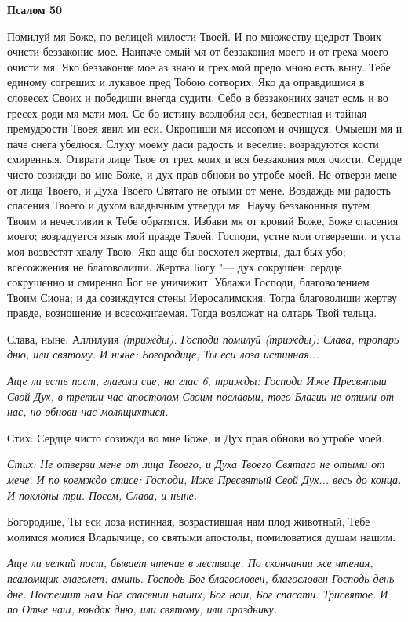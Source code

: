 \bfseries Псалом 50\normalfont{}


Помилуй мя Боже, по велицей милости Твоей. И по множеству щедрот Твоих очисти беззаконие мое. Наипаче омый мя от беззакония моего и от греха моего очисти мя. Яко беззаконие мое аз знаю и грех мой предо мною есть выну. Тебе единому согреших и лукавое пред Тобою сотворих. Яко да оправдишися в словесех Своих и победиши внегда судити. Себо в беззакониих зачат есмь и во гресех роди мя мати моя. Се бо истину возлюбил еси, безвестная и тайная премудрости Твоея явил ми еси. Окропиши мя иссопом и очищуся. Омыеши мя и паче снега убелюся. Слуху моему даси радость и веселие: возрадуются кости смиренныя. Отврати лице Твое от грех моих и вся беззакония моя очисти. Сердце чисто созижди во мне Боже, и дух прав обнови во утробе моей. Не отверзи мене от лица Твоего, и Духа Твоего Святаго не отыми от мене. Воздаждь ми радость спасения Твоего и духом владычным утверди мя. Научу беззаконныя путем Твоим и нечестивии к Тебе обратятся. Избави мя от кровий Боже, Боже спасения моего; возрадуется язык мой правде Твоей. Господи, устне мои отверзеши, и уста моя возвестят хвалу Твою. Яко аще бы восхотел жертвы, дал бых убо; всесожжения не благоволиши. Жертва Богу "--- дух сокрушен: сердце сокрушенно и смиренно Бог не уничижит. Ублажи Господи, благоволением Твоим Сиона; и да созиждутся стены Иеросалимския. Тогда благоволиши жертву правде, возношение и всесожигаемая. Тогда возложат на олтарь Твой тельца.


Слава, ныне. Аллилуия \itshape (трижды)\normalfont{}. Господи помилуй \itshape (трижды)\normalfont{}: Слава, тропарь дню, или святому. И ныне: Богородице, Ты еси лоза истинная...


\itshape Аще ли есть пост, глаголи сие, на глас 6, трижды:\normalfont{} Господи Иже Пресвятыи Свой Дух, в третии час апостолом Своим пославыи, того Благии не отими от нас, но обнови нас молящихтися.


Стих: Сердце чисто созижди во мне Боже, и Дух прав обнови во утробе моей.


\itshape Стих:\normalfont{} Не отверзи мене от лица Твоего, и Духа Твоего Святаго не отыми от мене. И по коемждо стисе: Господи, Иже Пресвятый Свой Дух... весь до конца. И поклоны три. Посем, Слава, и ныне.


Богородице, Ты еси лоза истинная, возрастившая нам плод животный, Тебе молимся молися Владычице, со святыми апостолы, помиловатися душам нашим.


\itshape Аще ли велкий пост, бывает чтение в лествице.\normalfont{} По скончании же чтения, псаломщик глаголет: аминь. Господь Бог благословен, благословен Господь день дне. Поспешит нам Бог спасении наших, Бог наш, Бог спасати. Трисвятое. И по Отче наш, кондак дню, или святому, или празднику.


